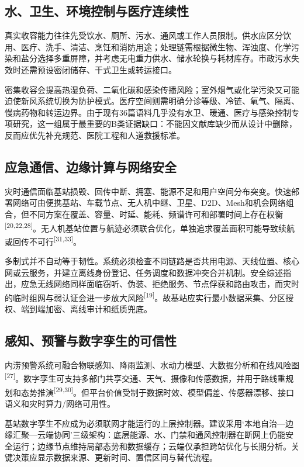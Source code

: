 \documentclass[UTF8,a4paper,zihao=-4]{ctexart}
\begin{document}
\subsection{水、卫生、环境控制与医疗连续性}

真实收容能力往往先受饮水、厕所、污水、通风或工作人员限制。供水应区分饮用、医疗、洗手、清洁、烹饪和消防用途；处理链需根据微生物、浑浊度、化学污染和盐分选择多重屏障，并考虑无电重力供水、储水轮换与耗材库存。市政污水失效时还需预设密闭储存、干式卫生或转运接口。

密集收容会提高热湿负荷、二氧化碳和感染传播风险；室外烟气或化学污染又可能迫使新风系统切换为防护模式。医疗空间则需明确分诊等级、冷链、氧气、隔离、慢病药物和转运边界。由于现有36篇语料几乎没有水卫、暖通、医疗与感染控制专项研究，这一组属于最重要的B类证据缺口：不能因文献库缺少而从设计中删除，反而应优先补充规范、医院工程和人道救援标准。

\subsection{应急通信、边缘计算与网络安全}

灾时通信面临基站损毁、回传中断、拥塞、能源不足和用户空间分布突变。快速部署网络可由便携基站、车载节点、无人机中继、卫星、D2D、Mesh和机会网络组合，但不同方案在覆盖、容量、时延、能耗、频谱许可和部署时间上存在权衡\textsuperscript{[20,22,28]}。无人机基站位置与航迹必须联合优化，单独追求覆盖面积可能导致续航或回传不可行\textsuperscript{[31,33]}。

多制式并不自动等于韧性。系统必须检查不同链路是否共用电源、天线位置、核心网或云服务，并建立离线身份登记、任务调度和数据冲突合并机制。安全综述指出，应急无线网络同样面临窃听、伪装、拒绝服务、节点俘获和路由攻击，而灾时的临时组网与弱认证会进一步放大风险\textsuperscript{[19]}。故基站应实行最小数据采集、分区授权、端到端加密、离线审计和纸质兜底。

\subsection{感知、预警与数字孪生的可信性}

内涝预警系统可融合物联感知、降雨监测、水动力模型、大数据分析和在线风险图\textsuperscript{[27]}。数字孪生可支持多部门共享交通、天气、摄像和传感数据，并用于路线重规划和态势推演\textsuperscript{[29,30]}。但平台价值受制于数据时效、模型偏差、传感器漂移、接口语义和灾时算力/网络可用性。

基站数字孪生不应成为必须联网才能运行的上层控制器。建议采用‘本地自治—边缘汇聚—云端协同’三级架构：底层能源、水、门禁和通风控制器在断网上仍能安全运行；边缘节点维持局部态势和数据缓存；云端仅承担跨站优化与长期分析。关键决策应显示数据来源、更新时间、置信区间与替代流程。
\end{document}
